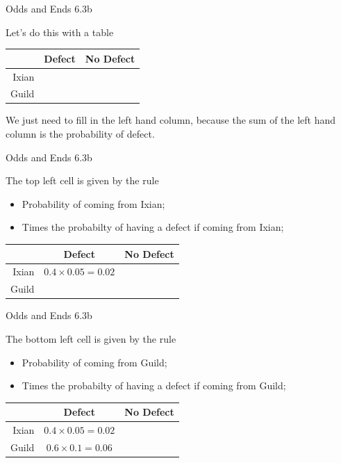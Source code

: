 \documentclass[
  ignorenonframetext,
]{beamer}
\providecommand{\tightlist}{%
  \setlength{\itemsep}{0pt}\setlength{\parskip}{0pt}}
\renewcommand{\,}{\text{, }}
\begin{document}
\begin{frame}{Odds and Ends 6.3b}
\protect\hypertarget{odds-and-ends-6.3b-1}{}

Let's do this with a table

\begin{longtable}[]{@{}rcc@{}}
\toprule
& Defect & No Defect\tabularnewline
\midrule
\endhead
Ixian & &\tabularnewline
Guild & &\tabularnewline
\bottomrule
\end{longtable}

We just need to fill in the left hand column, because the sum of the
left hand column is the probability of defect.

\end{frame}

\begin{frame}{Odds and Ends 6.3b}
\protect\hypertarget{odds-and-ends-6.3b-2}{}

The top left cell is given by the rule

\begin{itemize}
\tightlist
\item
  Probability of coming from Ixian;
\item
  Times the probabilty of having a defect if coming from Ixian; \pause
\end{itemize}

\begin{longtable}[]{@{}rcc@{}}
\toprule
& Defect & No Defect\tabularnewline
\midrule
\endhead
Ixian & \(0.4 \times 0.05 = 0.02\) &\tabularnewline
Guild & &\tabularnewline
\bottomrule
\end{longtable}

\end{frame}

\begin{frame}{Odds and Ends 6.3b}
\protect\hypertarget{odds-and-ends-6.3b-3}{}

The bottom left cell is given by the rule

\begin{itemize}
\tightlist
\item
  Probability of coming from Guild;
\item
  Times the probabilty of having a defect if coming from Guild; \pause
\end{itemize}

\begin{longtable}[]{@{}rcc@{}}
\toprule
& Defect & No Defect\tabularnewline
\midrule
\endhead
Ixian & \(0.4 \times 0.05 = 0.02\) &\tabularnewline
Guild & \(0.6 \times 0.1 = 0.06\) &\tabularnewline
\bottomrule
\end{longtable}

\end{frame}
\end{document}
